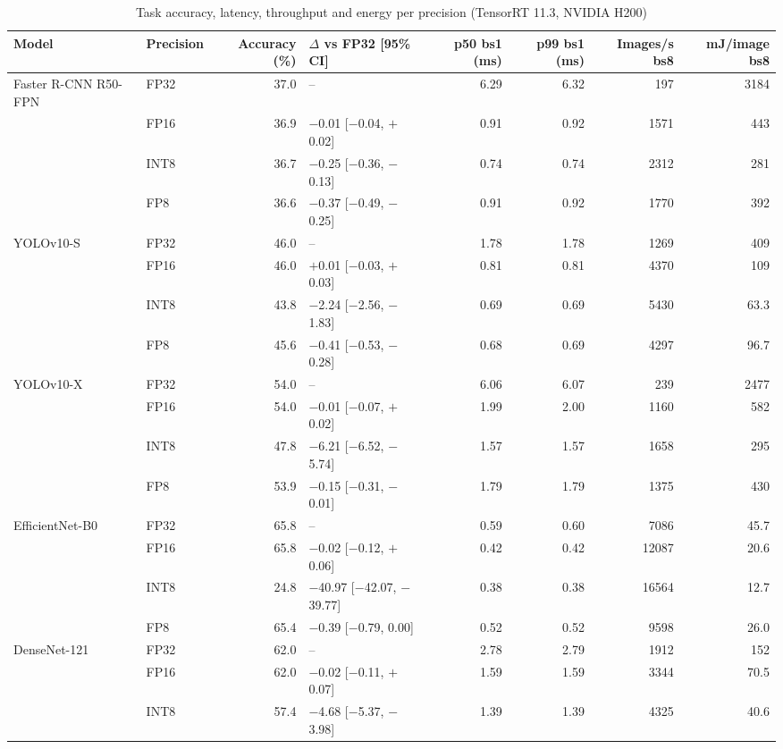 \begin{table}
\footnotesize\setlength{\tabcolsep}{4pt}
\caption{Task accuracy, latency, throughput and energy per precision (TensorRT 11.3, NVIDIA H200)}\label{tab:accuracy}
\begin{tabular}{@{}llrlrrrr@{}}
\toprule
Model & Precision & Accuracy (\%) & $\Delta$ vs FP32 [95\% CI] & p50 bs1 (ms) & p99 bs1 (ms) & Images/s bs8 & mJ/image bs8 \\
\midrule
Faster R-CNN R50-FPN & FP32 & 37.0 & -- & 6.29 & 6.32 & 197 & 3184 \\
 & FP16 & 36.9 & $-$0.01 [$-$0.04, $+$0.02] & 0.91 & 0.92 & 1571 & 443 \\
 & INT8 & 36.7 & $-$0.25 [$-$0.36, $-$0.13] & 0.74 & 0.74 & 2312 & 281 \\
 & FP8 & 36.6 & $-$0.37 [$-$0.49, $-$0.25] & 0.91 & 0.92 & 1770 & 392 \\
\midrule
YOLOv10-S & FP32 & 46.0 & -- & 1.78 & 1.78 & 1269 & 409 \\
 & FP16 & 46.0 & $+$0.01 [$-$0.03, $+$0.03] & 0.81 & 0.81 & 4370 & 109 \\
 & INT8 & 43.8 & $-$2.24 [$-$2.56, $-$1.83] & 0.69 & 0.69 & 5430 & 63.3 \\
 & FP8 & 45.6 & $-$0.41 [$-$0.53, $-$0.28] & 0.68 & 0.69 & 4297 & 96.7 \\
\midrule
YOLOv10-X & FP32 & 54.0 & -- & 6.06 & 6.07 & 239 & 2477 \\
 & FP16 & 54.0 & $-$0.01 [$-$0.07, $+$0.02] & 1.99 & 2.00 & 1160 & 582 \\
 & INT8 & 47.8 & $-$6.21 [$-$6.52, $-$5.74] & 1.57 & 1.57 & 1658 & 295 \\
 & FP8 & 53.9 & $-$0.15 [$-$0.31, $-$0.01] & 1.79 & 1.79 & 1375 & 430 \\
\midrule
EfficientNet-B0 & FP32 & 65.8 & -- & 0.59 & 0.60 & 7086 & 45.7 \\
 & FP16 & 65.8 & $-$0.02 [$-$0.12, $+$0.06] & 0.42 & 0.42 & 12087 & 20.6 \\
 & INT8 & 24.8 & $-$40.97 [$-$42.07, $-$39.77] & 0.38 & 0.38 & 16564 & 12.7 \\
 & FP8 & 65.4 & $-$0.39 [$-$0.79, 0.00] & 0.52 & 0.52 & 9598 & 26.0 \\
\midrule
DenseNet-121 & FP32 & 62.0 & -- & 2.78 & 2.79 & 1912 & 152 \\
 & FP16 & 62.0 & $-$0.02 [$-$0.11, $+$0.07] & 1.59 & 1.59 & 3344 & 70.5 \\
 & INT8 & 57.4 & $-$4.68 [$-$5.37, $-$3.98] & 1.39 & 1.39 & 4325 & 40.6 \\

\end{tabular}
\end{table}
